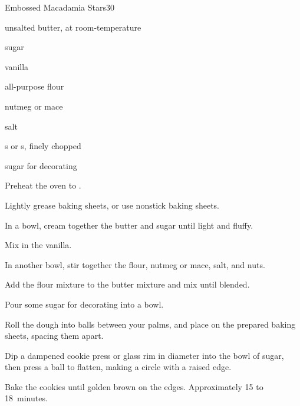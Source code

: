 \begin{recipe}{Embossed Macadamia Stars}{}{30}

\begin{ingredients}
\item {} unsalted butter, at room-temperature
\item \C{\half} sugar
\item {} vanilla
\item {} all-purpose flour
\item \tp{\half} nutmeg or mace
\item \tp{\eighth} salt
\item \C{\half} s or s, finely chopped
\item sugar for decorating
\end{ingredients}

\begin{directions}
\item Preheat the oven to .
\item Lightly grease baking sheets, or use nonstick baking sheets.
\item In a bowl, cream together the butter and sugar until light and fluffy.
\item Mix in the vanilla.
\item In another bowl, stir together the flour, nutmeg or mace, salt, and nuts.
\item Add the flour mixture to the butter mixture and mix until blended.
\item Pour some sugar for decorating into a bowl.
\item Roll the dough into \inch{\threequarter}  balls between your palms, and place on the prepared baking sheets, spacing them  apart.
\item Dip a dampened cookie press or glass rim \inch{2\quarter} in diameter into the bowl of sugar, then press a ball to flatten, making a circle with a raised edge.
\item Bake the cookies until golden brown on the edges. Approximately 15 to 18~minutes.
\end{directions}


\end{recipe}
